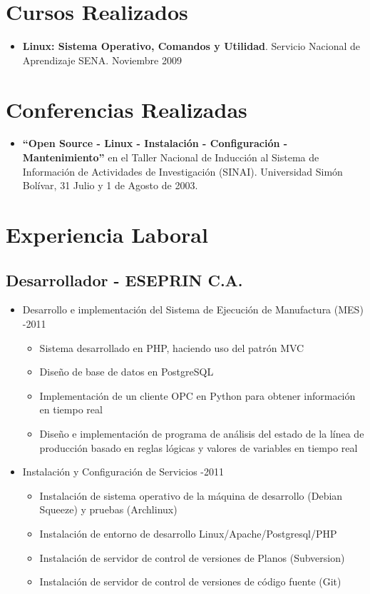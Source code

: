 \documentclass[letterpaper,11pt]{report}
\begin{document}
\section*{Cursos Realizados}
\begin{itemize}
\item \textbf{Linux: Sistema Operativo, Comandos y Utilidad}. Servicio Nacional de Aprendizaje SENA. Noviembre 2009
\end{itemize}

\section*{Conferencias Realizadas}
\begin{itemize}
\item
\textbf{``Open Source - Linux - Instalación - Configuración - Mantenimiento''} en el Taller Nacional de Inducción al Sistema de Información de Actividades de Investigación (SINAI). Universidad Simón Bolívar, 31 Julio y 1 de Agosto de 2003.
\end{itemize}

\newpage
\section*{Experiencia Laboral}

\subsection*{Desarrollador - ESEPRIN C.A.}
  \begin{itemize}
    \item Desarrollo e implementación del Sistema de Ejecución de Manufactura (MES) -2011
        \begin{itemize}
        \item Sistema desarrollado en PHP, haciendo uso del patrón MVC
        \item Diseño de base de datos en PostgreSQL
        \item Implementación de un cliente OPC en Python para obtener información en tiempo real
        \item Diseño e implementación de programa de análisis del estado de la línea de producción basado en reglas lógicas y valores de variables en tiempo real
        \end{itemize}
    \item Instalación y Configuración de Servicios -2011
        \begin{itemize}
        \item Instalación de sistema operativo de la máquina de desarrollo (Debian Squeeze) y pruebas (Archlinux)
        \item Instalación de entorno de desarrollo Linux/Apache/Postgresql/PHP
        \item Instalación de servidor de control de versiones de Planos (Subversion)
        \item Instalación de servidor de control de versiones de código fuente (Git)
        \end{itemize}
  \end{itemize}
\end{document}
